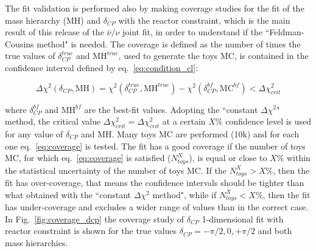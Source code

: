 The fit validation is performed also by making coverage studies for the fit of 
the mass hierarchy (MH) and $\delta_{CP}$ with the reactor constraint, which is the main 
result of this release of the $\bar{\nu}/\nu$ joint fit,
in order to understand if the ``Feldman-Cousins method" is needed.
The coverage is defined as the number of times the true values of $\delta_{CP}^{true}$ and $\text{MH}^{true}$, used to generate the toys MC,
is contained in the confidence interval defined by eq.~\ref{eq:condition_cl}:

\begin{equation}
\Delta \chi^2 (\delta_{CP},\text{MH}) = \chi^2 (\delta_{CP}^{true},\text{MH}^{true}) - \chi^2 (\delta_{CP}^{bf},\text{MC}^{bf}) < \Delta \chi^2_{crit}
\label{eq:coverage}
\end{equation}

where $\delta_{CP}^{bf}$ and $\text{MH}^{bf}$ are the best-fit values.
Adopting the ``constant $\Delta \chi^2$" method, the critical value $\Delta \chi^2_{crit} = \Delta \chi^2_{crit}$  
at a certain $X$\% confidence level is used for any value of $\delta_{CP}$ and MH.
Many toys MC are performed (10k) and for each one eq.~\ref{eq:coverage} is tested.
The fit has a good coverage if the number of toys MC,
for which eq.~\ref{eq:coverage} is satisfied ($N_{toys}^{X}$),
is equal or close to $X$\% within the statistical uncertainty of the number of toys MC.
If the $N_{toys}^{X} > X\%$, then the fit has over-coverage,
that means the confidence intervals should be tighter than what obtained with 
the ``constant $\Delta \chi^2$ method",
while if $N_{toys}^{X} < X\%$, then the fit has under-coverage 
and excludes a wider range of values than in the correct case.
In Fig.~\ref{fig:coverage_dcp} the coverage study 
of $\delta_{CP}$ 1-dimensional fit with reactor constraint
is shown for the true values $\delta_{CP} = -\pi/2, 0, +\pi/2$
and both mass hierarchies.

